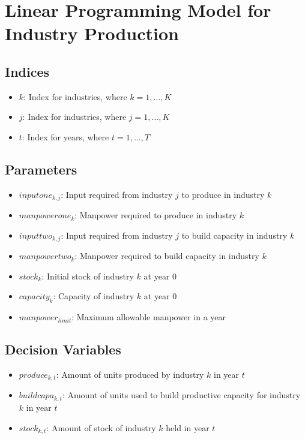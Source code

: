 \documentclass{article}
\begin{document}
\section*{Linear Programming Model for Industry Production}

\subsection*{Indices}
\begin{itemize}
    \item $k$: Index for industries, where $k = 1, \ldots, K$
    \item $j$: Index for industries, where $j = 1, \ldots, K$
    \item $t$: Index for years, where $t = 1, \ldots, T$
\end{itemize}

\subsection*{Parameters}
\begin{itemize}
    \item $inputone_{k,j}$: Input required from industry $j$ to produce in industry $k$
    \item $manpowerone_k$: Manpower required to produce in industry $k$
    \item $inputtwo_{k,j}$: Input required from industry $j$ to build capacity in industry $k$
    \item $manpowertwo_k$: Manpower required to build capacity in industry $k$
    \item $stock_k$: Initial stock of industry $k$ at year 0
    \item $capacity_k$: Capacity of industry $k$ at year 0
    \item $manpower_{limit}$: Maximum allowable manpower in a year
\end{itemize}

\subsection*{Decision Variables}
\begin{itemize}
    \item $produce_{k,t}$: Amount of units produced by industry $k$ in year $t$
    \item $buildcapa_{k,t}$: Amount of units used to build productive capacity for industry $k$ in year $t$
    \item $stock_{k,t}$: Amount of stock of industry $k$ held in year $t$
\end{itemize}
\end{document}
